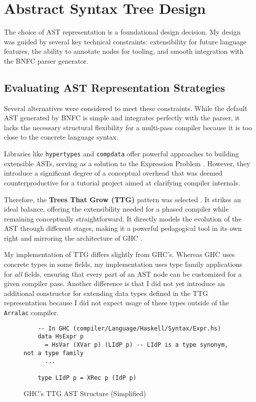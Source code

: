 \section{Abstract Syntax Tree Design}
\label{sec:Design:AST}

The choice of AST representation is a foundational design decision. My design was guided by several key technical constraints: extensibility for future language features, the ability to annotate nodes for tooling, and smooth integration with the BNFC parser generator.

\subsection{Evaluating AST Representation Strategies}
Several alternatives were considered to meet these constraints. While the default AST generated by BNFC is simple and integrates perfectly with the parser, it lacks the necessary structural flexibility for a multi-pass compiler because it is too close to the concrete language syntax.

Libraries like \texttt{hypertypes} \cite{hypertypes-hackage} and \texttt{compdata} \cite{compdata-hackage} offer powerful approaches to building extensible ASTs, serving as a solution to the Expression Problem \cite{wadler-expression-1998}. However, they introduce a significant degree of a conceptual overhead that was deemed counterproductive for a tutorial project aimed at clarifying compiler internals.

Therefore, the \textbf{Trees That Grow (TTG)} pattern was selected \cite{trees-that-grow-2016}. It strikes an ideal balance, offering the extensibility needed for a phased compiler while remaining conceptually straightforward. It directly models the evolution of the AST through different stages, making it a powerful pedagogical tool in its own right and mirroring the architecture of GHC \cite{ghc-gitlab-2025}.


My implementation of TTG differs slightly from GHC's. Whereas GHC uses concrete types in some fields, my implementation uses type family applications for \textit{all} fields, ensuring that every part of an AST node can be customized for a given compiler pass. Another difference is that I did not yet introduce an additional constructor for extending data types defined in the TTG representation because I did not expect usage of these types outside of the \texttt{Arralac} compiler.

\begin{figure}
    \centering
    \begin{verbatim}
    -- In GHC (compiler/Language/Haskell/Syntax/Expr.hs)
    data HsExpr p
      = HsVar (XVar p) (LIdP p) -- LIdP is a type synonym, not a type family
      ...
    
    type LIdP p = XRec p (IdP p)
    \end{verbatim}
    \caption{GHC's TTG AST Structure (Simplified)}
\end{figure}

